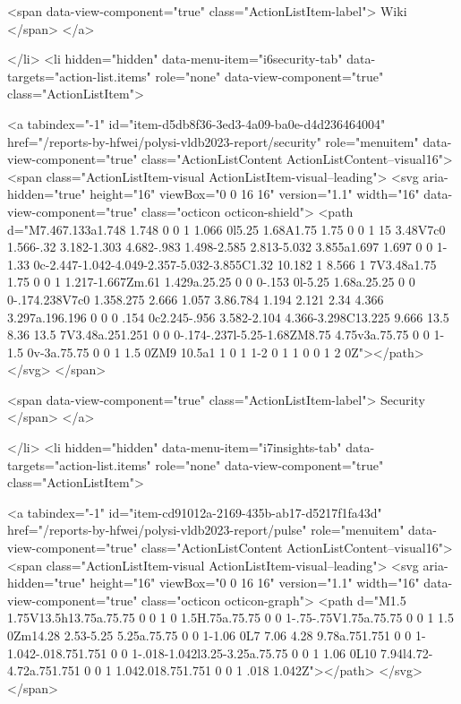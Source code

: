 {{        <span data-view-component="true" class="ActionListItem-label">
          Wiki
</span>      
</a>
  
</li>
        <li hidden="hidden" data-menu-item="i6security-tab" data-targets="action-list.items" role="none" data-view-component="true" class="ActionListItem">
    
    
    <a tabindex="-1" id="item-d5db8f36-3ed3-4a09-ba0e-d4d236464004" href="/reports-by-hfwei/polysi-vldb2023-report/security" role="menuitem" data-view-component="true" class="ActionListContent ActionListContent--visual16">
        <span class="ActionListItem-visual ActionListItem-visual--leading">
          <svg aria-hidden="true" height="16" viewBox="0 0 16 16" version="1.1" width="16" data-view-component="true" class="octicon octicon-shield">
    <path d="M7.467.133a1.748 1.748 0 0 1 1.066 0l5.25 1.68A1.75 1.75 0 0 1 15 3.48V7c0 1.566-.32 3.182-1.303 4.682-.983 1.498-2.585 2.813-5.032 3.855a1.697 1.697 0 0 1-1.33 0c-2.447-1.042-4.049-2.357-5.032-3.855C1.32 10.182 1 8.566 1 7V3.48a1.75 1.75 0 0 1 1.217-1.667Zm.61 1.429a.25.25 0 0 0-.153 0l-5.25 1.68a.25.25 0 0 0-.174.238V7c0 1.358.275 2.666 1.057 3.86.784 1.194 2.121 2.34 4.366 3.297a.196.196 0 0 0 .154 0c2.245-.956 3.582-2.104 4.366-3.298C13.225 9.666 13.5 8.36 13.5 7V3.48a.251.251 0 0 0-.174-.237l-5.25-1.68ZM8.75 4.75v3a.75.75 0 0 1-1.5 0v-3a.75.75 0 0 1 1.5 0ZM9 10.5a1 1 0 1 1-2 0 1 1 0 0 1 2 0Z"></path>
</svg>
        </span>
      
        <span data-view-component="true" class="ActionListItem-label">
          Security
</span>      
</a>
  
</li>
        <li hidden="hidden" data-menu-item="i7insights-tab" data-targets="action-list.items" role="none" data-view-component="true" class="ActionListItem">
    
    
    <a tabindex="-1" id="item-cd91012a-2169-435b-ab17-d5217f1fa43d" href="/reports-by-hfwei/polysi-vldb2023-report/pulse" role="menuitem" data-view-component="true" class="ActionListContent ActionListContent--visual16">
        <span class="ActionListItem-visual ActionListItem-visual--leading">
          <svg aria-hidden="true" height="16" viewBox="0 0 16 16" version="1.1" width="16" data-view-component="true" class="octicon octicon-graph">
    <path d="M1.5 1.75V13.5h13.75a.75.75 0 0 1 0 1.5H.75a.75.75 0 0 1-.75-.75V1.75a.75.75 0 0 1 1.5 0Zm14.28 2.53-5.25 5.25a.75.75 0 0 1-1.06 0L7 7.06 4.28 9.78a.751.751 0 0 1-1.042-.018.751.751 0 0 1-.018-1.042l3.25-3.25a.75.75 0 0 1 1.06 0L10 7.94l4.72-4.72a.751.751 0 0 1 1.042.018.751.751 0 0 1 .018 1.042Z"></path>
</svg>
        </span>
      
}}
